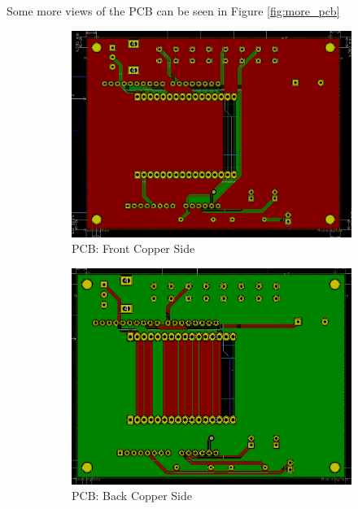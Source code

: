 \documentclass{article}
\begin{document}
\newpage
Some more views of the PCB can be seen in Figure \ref{fig:more_pcb}
\begin{figure}[h]
    \centering
    \begin{subfigure}{0.4\textwidth}
        \includegraphics[width=\textwidth]{PCB_Front.PNG}
        \caption{PCB: Front Copper Side}
    \end{subfigure}
    \begin{subfigure}{0.4\textwidth}
        \includegraphics[width=\textwidth]{PCB_Back.PNG}
        \caption{PCB: Back Copper Side}
    \end{subfigure}
    \begin{subfigure}{0.4\textwidth}

\end{subfigure}
\end{figure}
\end{document}
